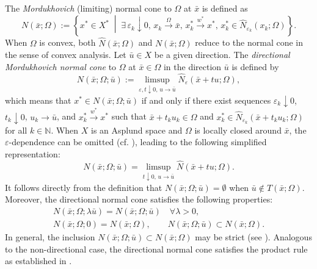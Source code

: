 \documentclass[12pt,twoside,reqno]{amsart}
\theoremstyle{definition}
\numberwithin{equation}{section}
\begin{document}
The \emph{Mordukhovich} (limiting) normal cone to $\Omega$ at $\bar{x}$ is defined as
\begin{equation*}
    N(\bar{x};\Omega) := \left\{ x^* \in X^* \;\middle|\; \exists\, \varepsilon_k \downarrow 0, \, x_k \xrightarrow{\Omega} \bar{x}, \, x_k^* \xrightarrow{w^*} x^*, \, x_k^* \in \widehat{N}_{\varepsilon_k}(x_k;\Omega) \right\}.
\end{equation*}
When $\Omega$ is convex, both $\widehat{N}(\bar{x}; \Omega)$ and $N(\bar{x}; \Omega)$ reduce to the normal cone in the sense of convex analysis. Let $\bar{u} \in X$ be a given direction. The \emph{directional Mordukhovich normal cone} to $\Omega$ at $\bar{x} \in \Omega$ in the direction $\bar{u}$ is defined by
\begin{equation*}
    N(\bar{x}; \Omega; \bar{u}) := \limsup_{\varepsilon, t \downarrow 0, \, u \to \bar{u}} \widehat{N}_{\varepsilon}(\bar{x} + tu; \Omega),
\end{equation*}
which means that $x^* \in N(\bar{x}; \Omega; \bar{u})$ if and only if there exist sequences $\varepsilon_k \downarrow 0$, $t_k \downarrow 0$, $u_k \to \bar{u}$, and $x_k^* \xrightarrow{w^*} x^*$ such that $\bar{x} + t_k u_k \in \Omega$ and $x_k^* \in \widehat{N}_{\varepsilon_k}(\bar{x} + t_k u_k; \Omega)$ for all $k \in \mathbb{N}$. 
When $X$ is an Asplund space and $\Omega$ is locally closed around $\bar{x}$, the $\varepsilon$-dependence can be omitted (cf. \cite[Theorem~2.34]{Mordukhovich2006variational}), leading to the following simplified representation:
\begin{equation*}
    N(\bar{x}; \Omega; \bar{u}) = \limsup_{t \downarrow 0, \, u \to \bar{u}} \widehat{N}(\bar{x} + tu; \Omega).
\end{equation*}
It follows directly from the definition that $N(\bar{x}; \Omega; \bar{u}) = \emptyset$ when $\bar{u} \notin T(\bar{x}; \Omega)$. Moreover, the directional normal cone satisfies the following properties:
\begin{equation*}
\begin{gathered}
    N(\bar{x}; \Omega; \lambda \bar{u}) = N(\bar{x}; \Omega; \bar{u}) \quad \forall \lambda > 0, \\
    N(\bar{x}; \Omega; 0) = N(\bar{x}; \Omega), \qquad
    N(\bar{x}; \Omega; \bar{u}) \subset N(\bar{x}; \Omega).
\end{gathered}
\end{equation*}
In general, the inclusion $N(\bar{x}; \Omega; \bar{u}) \subset N(\bar{x}; \Omega)$ may be strict (see \cite{long2017calculus}). Analogous to the non-directional case, the directional normal cone satisfies the product rule as established in \cite[(3.14) and Theorem~3.7]{long2017calculus}.  
\end{document}
